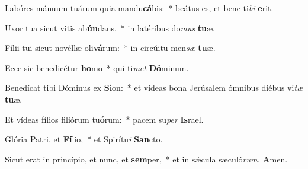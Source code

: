 \item Labóres mánuum tuárum quia mandu\textbf{cá}bis:~* beátus es, et bene ti\textit{bi} \textbf{e}rit.
\item Uxor tua sicut vitis ab\textbf{ún}dans,~* in latéribus do\textit{mus} \textbf{tu}æ.
\item Fílii tui sicut novéllæ oli\textbf{vá}rum:~* in circúitu men\hspace{0.03em}\textit{sæ} \textbf{tu}æ.
\item Ecce sic benedicétur \textbf{ho}mo~* qui ti\textit{met} \textbf{Dó}minum.
\item Benedícat tibi Dóminus ex \textbf{Si}on:~* et vídeas bona Jerúsalem ómnibus diébus vi\textit{tæ} \textbf{tu}æ.
\item Et vídeas fílios filiórum tu\textbf{ó}rum:~* pacem su\textit{per} \textbf{Is}rael.
\item Glória Patri, et \textbf{Fí}lio,~* et Spirítu\hspace{0.03em}\textit{i} \textbf{San}cto.
\item Sicut erat in princípio, et nunc, et \textbf{sem}per,~* et in sǽcula sæculó\textit{rum.} \textbf{A}men.
